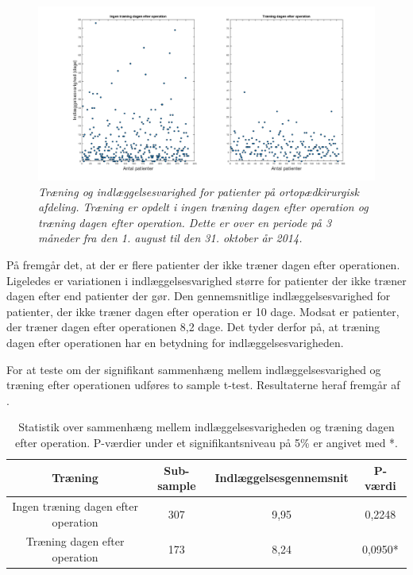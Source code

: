 \begin{figure}[H]
	\centering
	\includegraphics[scale=0.35]{figures/traeningindlaeg.png}
	\caption{\textit{Træning og indlæggelsesvarighed for patienter på ortopædkirurgisk afdeling. Træning er opdelt i ingen træning dagen efter operation og træning dagen efter operation. Dette er over en periode på 3 måneder fra den 1. august til den 31. oktober år 2014.}}
	\label{traeningindlaeg}
	\end{figure}

\noindent
På  fremgår det, at der er flere patienter der ikke træner dagen efter operationen. Ligeledes er variationen i indlæggelsesvarighed større for patienter der ikke træner dagen efter end patienter der gør. Den gennemsnitlige indlæggelsesvarighed for patienter, der ikke træner dagen efter operation er 10 dage. Modsat er patienter, der træner dagen efter operationen 8,2 dage. Det tyder derfor på, at træning dagen efter operationen har en betydning for indlæggelsesvarigheden. 

For at teste om der signifikant sammenhæng mellem indlæggelsesvarighed og træning efter operationen udføres to sample t-test. Resultaterne heraf fremgår af . 

\begin{table}[H]
\centering
\begin{tabular}{|c|c|c|c|}
\hline
\textbf{Træning}    & \textbf{Sub-sample} & \textbf{Indlæggelsesgennemsnit} & \textbf{P-værdi} \\ \hline
Ingen træning dagen efter operation      & 307                 & 9,95                            & 0,2248           \\ \hline
Træning dagen efter operation & 173                 & 8,24                            & 0,0950*          \\ \hline
\end{tabular}
\caption{Statistik over sammenhæng mellem indlæggelsesvarigheden og træning dagen efter operation. P-værdier under et signifikantsniveau på 5\% er angivet med *.}
\label{traeningindlaegtab}
\end{table}

